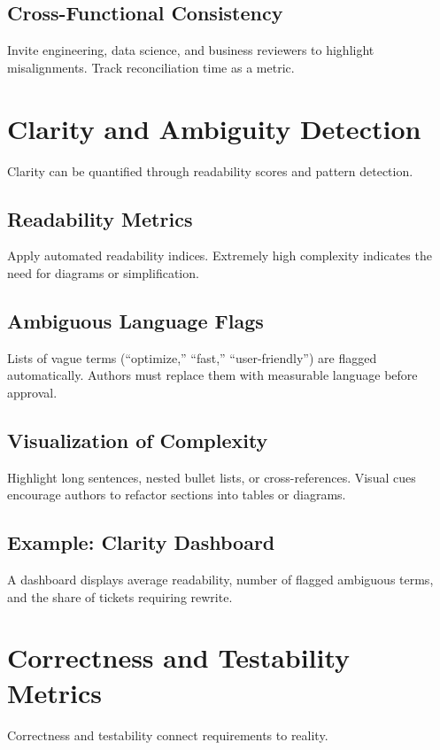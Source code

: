 \subsection{Cross-Functional Consistency}
Invite engineering, data science, and business reviewers to highlight misalignments. Track reconciliation time as a metric.

\section{Clarity and Ambiguity Detection}
\label{sec:clarity-metrics}

Clarity can be quantified through readability scores and pattern detection.

\subsection{Readability Metrics}
Apply automated readability indices. Extremely high complexity indicates the need for diagrams or simplification.

\subsection{Ambiguous Language Flags}
Lists of vague terms (``optimize,'' ``fast,'' ``user-friendly'') are flagged automatically. Authors must replace them with measurable language before approval.

\subsection{Visualization of Complexity}
Highlight long sentences, nested bullet lists, or cross-references. Visual cues encourage authors to refactor sections into tables or diagrams.

\subsection{Example: Clarity Dashboard}
A dashboard displays average readability, number of flagged ambiguous terms, and the share of tickets requiring rewrite.

\section{Correctness and Testability Metrics}
\label{sec:correctness-metrics}

Correctness and testability connect requirements to reality.

